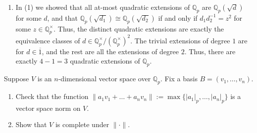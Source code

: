 \documentclass[12 pt, letterpaper]{hmcpset}
\begin{document}
\begin{solution}
\begin{enumerate}
			Thus, we can write this as $\mathbb{Q}_{p}^{\times} / (\mathbb{Q}_{p}^{\times})^{2} = \{ \overline{1}, \overline{p}, \overline{d}, \overline{p d} \}$.

		\item In (1) we showed that all at-most quadratic extensions of $\mathbb{Q}_{p}$ are $\mathbb{Q}_{p}(\sqrt{d})$ for some $d$, and that $\mathbb{Q}_{p}(\sqrt{d_{1}}) \cong \mathbb{Q}_{p}(\sqrt{d_{2}})$ if and only if $d_{1} d_{2}^{-1} = z^{2}$ for some $z \in \mathbb{Q}_{p}^{\times}$. Thus, the distinct quadratic extensions are exactly the equivalence classes of $d \in \mathbb{Q}_{p}^{\times} / (\mathbb{Q}_{p}^{\times})^{2}$. The trivial extensions of degree $1$ are for $d \in \overline{1}$, and the rest are all the extensions of degree $2$. Thus, there are exactly $4 - 1 = 3$ quadratic extensions of $\mathbb{Q}_{p}$.
	\end{enumerate}
\end{solution}

\pagebreak

\begin{problem}[(4)]
	Suppose $V$ is an $n$-dimensional vector space over $\mathbb{Q}_{p}$. Fix a basis $B = (v_{1}, \dots, v_{n})$.
	\begin{enumerate}
		\item Check that the function $\lVert a_{1} v_{1} + \dots + a_{n} v_{n} \rVert := \max \{ \lvert a_{1} \rvert_{p}, \dots, \lvert a_{n} \rvert_{p} \}$ is a vector space norm on $V$.
		\item Show that $V$ is complete under $\lVert \cdot \rVert$.
	\end{enumerate}
\end{problem}
\end{document}
